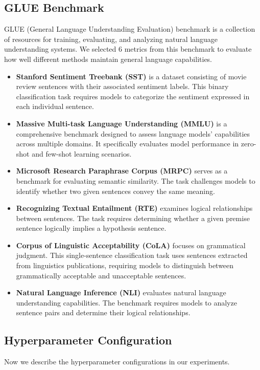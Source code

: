 \subsection{GLUE Benchmark}
GLUE (General Language Understanding Evaluation) \cite{glue} benchmark is a collection of resources for training, evaluating, and analyzing natural language understanding systems. We selected 6 metrics from this benchmark to evaluate how well different methods maintain general language capabilities.
\begin{itemize}
    \item \textbf{Stanford Sentiment Treebank (SST)} \cite{sst} is a dataset consisting of movie review sentences with their associated sentiment labels. This binary classification task requires models to categorize the sentiment expressed in each individual sentence.
    \item \textbf{Massive Multi-task Language Understanding (MMLU)} \cite{mmlu} is a comprehensive benchmark designed to assess language models' capabilities across multiple domains. It specifically evaluates model performance in zero-shot and few-shot learning scenarios.
    \item \textbf{Microsoft Research Paraphrase Corpus (MRPC)} \cite{mrpc} serves as a benchmark for evaluating semantic  similarity. The task challenges models to identify whether two given sentences convey the same meaning.
    \item \textbf{Recognizing Textual Entailment (RTE)} \cite{rte} examines logical relationships between sentences. The task requires determining whether a given premise sentence logically implies a hypothesis sentence.
    \item \textbf{Corpus of Linguistic Acceptability (CoLA)} \cite{cola} focuses on grammatical judgment. This single-sentence classification task uses sentences extracted from linguistics publications, requiring models to distinguish between grammatically acceptable and unacceptable sentences.
    \item \textbf{Natural Language Inference (NLI)} \cite{nli} evaluates natural language understanding capabilities. The benchmark requires models to analyze sentence pairs and determine their logical relationships.
\end{itemize}

\subsection{Hyperparameter Configuration}
Now we describe the hyperparameter configurations in our experiments.

